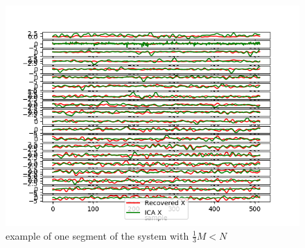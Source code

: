 \begin{figure}[H]
    \centering
	\includegraphics[scale=0.5]{figures/ch_7/M_N_2.png}
	\caption{example of one segment of the system with $\frac{1}{3} M<N$}
	\label{fig:M_N_2}
\end{figure}  




